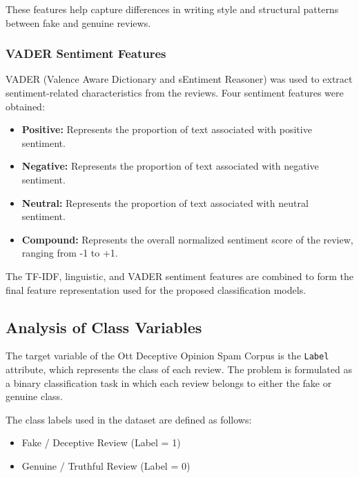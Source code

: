 \documentclass[12pt,a4paper]{report}
\begin{document}
These features help capture differences in writing style and structural patterns between fake and genuine reviews.

\subsubsection*{VADER Sentiment Features}

VADER (Valence Aware Dictionary and sEntiment Reasoner) was used to extract sentiment-related characteristics from the reviews. Four sentiment features were obtained:

\begin{itemize}
    \item \textbf{Positive:} Represents the proportion of text associated with positive sentiment.
    
    \item \textbf{Negative:} Represents the proportion of text associated with negative sentiment.
    
    \item \textbf{Neutral:} Represents the proportion of text associated with neutral sentiment.
    
    \item \textbf{Compound:} Represents the overall normalized sentiment score of the review, ranging from -1 to +1.
\end{itemize}

The TF-IDF, linguistic, and VADER sentiment features are combined to form the final feature representation used for the proposed classification models.

\subsection{Analysis of Class Variables}

The target variable of the Ott Deceptive Opinion Spam Corpus is the \texttt{Label} attribute, which represents the class of each review. The problem is formulated as a binary classification task in which each review belongs to either the fake or genuine class.

The class labels used in the dataset are defined as follows:

\begin{itemize}
    \item Fake / Deceptive Review (Label = 1)
    \item Genuine / Truthful Review (Label = 0)
\end{itemize}
\end{document}
